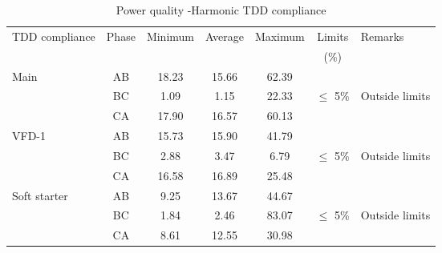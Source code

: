 \begin{table}[!htb]
	\caption{Power quality -Harmonic TDD compliance}
	\label{tbl_ch04_elecaudit_powerquality_tddcompliance}
	{\scriptsize
		
		\begin{tabular}{l|c|c|c|c|c|l}
			\hline
			TDD compliance & Phase & Minimum & Average & Maximum & Limits & Remarks \\ 
			&  &  &  &  & (\%) &  \\ 
			\hline
			Main & AB & 18.23 & 15.66 & 62.39 &  &  \\ 
			& BC & 1.09 & 1.15 & 22.33 & $\leq$ 5\% & Outside limits \\ 
			& CA & 17.90 & 16.57 & 60.13 &  &  \\ 
			\hline
			VFD-1 & AB & 15.73 & 15.90 & 41.79 &  &  \\ 
			& BC & 2.88 & 3.47 & 6.79 & $\leq$ 5\% & Outside limits \\ 
			& CA & 16.58 & 16.89 & 25.48 &  &  \\ 
			\hline
			Soft starter & AB & 9.25 & 13.67 & 44.67 &  &  \\ 
			& BC & 1.84 & 2.46 & 83.07 & $\leq$ 5\% & Outside limits \\ 
			& CA & 8.61 & 12.55 & 30.98 &  &  \\ 
			\hline
		\end{tabular}
		
	}%
\end{table}